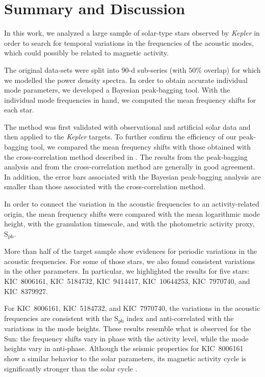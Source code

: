 \documentclass[twocolumn]{aastex61}%
\begin{document}
\section{Summary and Discussion}\label{sec:conclusions}

In this work, we analyzed a large sample of solar-type stars observed by {\it Kepler} in order to search for temporal variations in the frequencies of the acoustic modes, which could possibly be related to magnetic activity.

The original data-sets were split into 90-d sub-series (with $50\%$ overlap) for which we modelled the power density spectra. In order to obtain accurate individual mode parameters, we developed a Bayesian peak-bagging tool. With the individual mode frequencies in hand, we computed the mean frequency shifts for each star.

The method was first validated with observational and artificial solar data and then applied to the {\it Kepler} targets. To further confirm the efficiency of our peak-bagging tool, we compared the mean frequency shifts with those obtained with the cross-correlation method described in \citet{Kiefer2017}. The results from the peak-bagging analysis and from the cross-correlation method are generally in good agreement. In addition, the error bars associated with the Bayesian peak-bagging analysis are smaller than those associated with the cross-correlation method. 

In order to connect the variation in the acoustic frequencies to an activity-related origin, the mean frequency shifts were compared with the mean logarithmic mode height, with the granulation timescale, and with the photometric activity proxy, $\text{S}_\text{ph}$. 

More than half of the target sample show evidences for periodic variations in the acoustic frequencies. For some of those stars, we also found consistent variations in the other parameters. In particular, we highlighted the results for five stars: KIC~8006161, KIC~5184732, KIC~9414417, KIC~10644253, KIC~7970740, and KIC~8379927. 

For KIC~8006161, KIC~5184732, and KIC~7970740, the variations in the acoustic frequencies are consistent with the $\text{S}_\text{ph}$ index and anti-correlated with the variations in the mode heights. These results resemble what is observed for the Sun: the frequency shifts vary in phase with the activity level, while the mode heights vary in anti-phase. Although the seismic properties for KIC~8006161 show a similar behavior to the solar parameters, its magnetic activity cycle is significantly stronger than the solar cycle \citep[for a detailed study of KIC~8006161, see][]{Karoff2018}.
\end{document}
